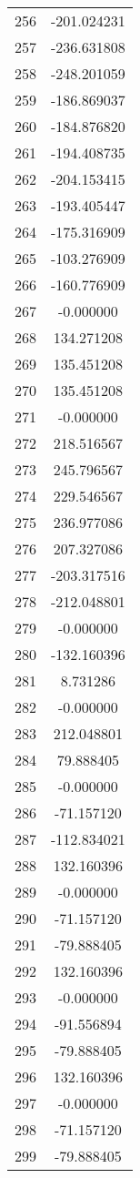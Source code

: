 \documentclass[12pt]{article}
\begin{document}
\begin{longtable}{@{}cc@{}}
256 & -201.024231 \\
257 & -236.631808 \\
258 & -248.201059 \\
259 & -186.869037 \\
260 & -184.876820 \\
261 & -194.408735 \\
262 & -204.153415 \\
263 & -193.405447 \\
264 & -175.316909 \\
265 & -103.276909 \\
266 & -160.776909 \\
267 & -0.000000 \\
268 & 134.271208 \\
269 & 135.451208 \\
270 & 135.451208 \\
271 & -0.000000 \\
272 & 218.516567 \\
273 & 245.796567 \\
274 & 229.546567 \\
275 & 236.977086 \\
276 & 207.327086 \\
277 & -203.317516 \\
278 & -212.048801 \\
279 & -0.000000 \\
280 & -132.160396 \\
281 & 8.731286 \\
282 & -0.000000 \\
283 & 212.048801 \\
284 & 79.888405 \\
285 & -0.000000 \\
286 & -71.157120 \\
287 & -112.834021 \\
288 & 132.160396 \\
289 & -0.000000 \\
290 & -71.157120 \\
291 & -79.888405 \\
292 & 132.160396 \\
293 & -0.000000 \\
294 & -91.556894 \\
295 & -79.888405 \\
296 & 132.160396 \\
297 & -0.000000 \\
298 & -71.157120 \\
299 & -79.888405 \\

\end{longtable}
\end{document}
